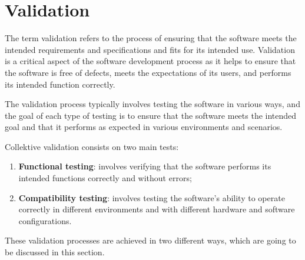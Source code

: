 \section{Validation}\label{section:validation}
The term validation refers to the process of ensuring that the software meets the intended requirements and specifications and fits for its intended use. Validation is a critical aspect of the software development process as it helps to ensure that the software is free of defects, meets the expectations of its users, and performs its intended function correctly.

The validation process typically involves testing the software in various ways, and the goal of each type of testing is to ensure that the software meets the intended goal and that it performs as expected in various environments and scenarios.

Collektive validation consists on two main tests:
\begin{enumerate}
    \item \textbf{Functional testing}: involves verifying that the software performs its intended functions correctly and without errors;
    \item \textbf{Compatibility testing}: involves testing the software's ability to operate correctly in different environments and with different hardware and software configurations.
\end{enumerate}
These validation processes are achieved in two different ways, which are going to be discussed in this section.


